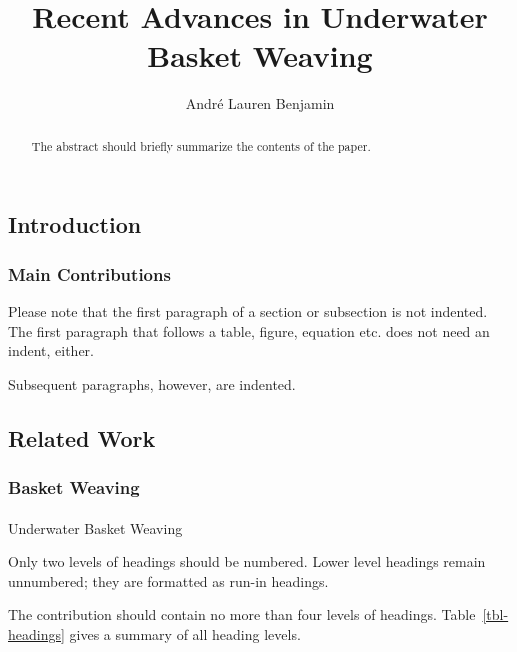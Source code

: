 \documentclass[
  runningheads]{llncs}
\title{Recent Advances in Underwater Basket Weaving}
\author{André Lauren Benjamin}
\date{}
\makeatletter
\let\oldparagraph\paragraph
\renewcommand{\paragraph}{
    \@ifstar
      \xxxParagraphStar
      \xxxParagraphNoStar
  }
\newcommand{\xxxParagraphStar}[1]{\oldparagraph*{#1}\mbox{}}
\newcommand{\xxxParagraphNoStar}[1]{\oldparagraph{#1}\mbox{}}
\makeatother
\begin{document}
\maketitle
\begin{abstract}
The abstract should briefly summarize the contents of the paper.
\end{abstract}


\subsection{Introduction}\label{sec-intro}

\subsubsection{Main Contributions}\label{main-contributions}

Please note that the first paragraph of a section or subsection is not
indented. The first paragraph that follows a table, figure, equation
etc. does not need an indent, either.

Subsequent paragraphs, however, are indented.

\subsection{Related Work}\label{related-work}

\subsubsection{Basket Weaving}\label{basket-weaving}

\paragraph{Underwater Basket Weaving}\label{underwater-basket-weaving}

Only two levels of headings should be numbered. Lower level headings
remain unnumbered; they are formatted as run-in headings.

The contribution should contain no more than four levels of headings.
Table~\ref{tbl-headings} gives a summary of all heading levels.
\end{document}
